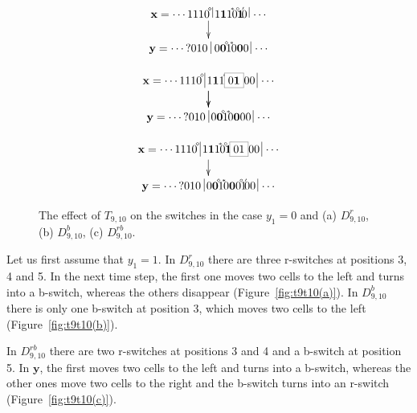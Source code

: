\documentclass{sn-jnl}
\newcommand{\lllp}{\vline}
\newcommand{\bx}{\mathbf{x}}
\newcommand{\by}{\mathbf{y}}
\newcommand{\gn}[1]{\!^{{}^{{#1}}}\!\!}
\begin{document}
\begin{figure}[!h]
    \centering
    \begin{subfigure}{0.32\textwidth}
{\scriptsize\[
\xymatrix@C=0.2cm@R=0.5cm{ 
\bx = \cdots 1110\gn{\diamond}\;\lllp  \,{1}\boldsymbol{1}1\gn{*}0\gn{\circ}\boldsymbol{1}\gn{\prime}   0\,\lllp\,\cdots\ar[d]  \\
\by = \cdots {?}010\;\lllp\;0{\bf{0}}\gn{\diamond}1\gn{*}0\boldsymbol{0}0  \,\lllp\,\cdots   
}
\]}
    \caption{}
    \label{fig:t9t10-cd(a)}
\end{subfigure}
\hfill
 \begin{subfigure}{0.32\textwidth}
{\scriptsize\[
\xymatrix@C=0.2cm@R=0.5cm{ 
\bx = \cdots 1110\gn{\diamond} \;\lllp \, 1\boldsymbol{1}1 \ar[d]  \gn{*}\fcolorbox{gray}{white}{{0\bf{1}}} 00\,\lllp\,\cdots\ar[d]  \\
\by = \cdots {?}010\;\lllp\,0{\bf{0}}\gn{\diamond}1 \gn{*}0\boldsymbol{0}00  \,\lllp\,\cdots 
}
\]}
    \caption{}
    \label{fig:t9t10-cd(b)}
\end{subfigure}
\hfill
\begin{subfigure}{0.32\textwidth}
{\scriptsize\[
\xymatrix@C=0.2cm@R=0.5cm{ 
\bx = \cdots 1110\gn{\diamond}\;\lllp  \,1\boldsymbol{1}1\gn{*}0\gn{\circ}\boldsymbol{1}   \gn{\prime}\fcolorbox{gray}{white}{01} 00\,\lllp\,\cdots\ar[d]    \\
\by = \cdots {?}010\;\lllp\,0{\bf{0}}\gn{\diamond}1\gn{*} 0\boldsymbol{0}0\gn{\circ}1\gn{\prime}00  \,\lllp\,\cdots  
}
\]}
    \caption{}
    \label{fig:t9t10-cd(c)} 
\end{subfigure}
\caption{The effect of $T_{9,10}$ on the switches in the case $y_1=0$ and
      (a) $D_{9,10}^r$, (b) $D_{9,10}^b$, (c) $D_{9,10}^{rb}$.}\label{fig:t9t10-cd}
\end{figure}

Let us first assume that $y_1=1$. In $D_{9,10}^r$ there are three r-switches at positions 3, 4 and 5. In the next time step, the first one moves two cells to the left and turns into a b-switch, whereas the others disappear (Figure~\ref{fig:t9t10(a)}). In $D_{9,10}^b$ there is only one b-switch at position 3, which moves two cells to the left (Figure~\ref{fig:t9t10(b)}).

In $D_{9,10}^{rb}$ there are two r-switches at positions 3 and 4 and a b-switch at position 5. In $\by$, the first moves two cells to the left and turns into a b-switch, whereas the other ones move two cells to the right and the b-switch turns into an r-switch (Figure~\ref{fig:t9t10(c)}).
\end{document}
